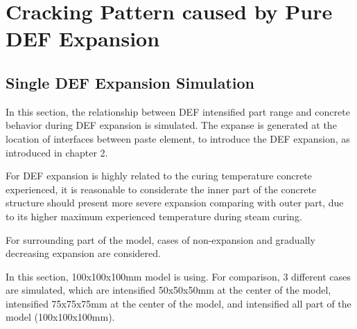 \clearpage
\section{Cracking Pattern caused by Pure DEF Expansion}

\subsection{Single DEF Expansion Simulation}

In this section, the relationship between DEF intensified part range and concrete behavior during DEF expansion is simulated. The expanse is generated at the location of interfaces between paste element, to introduce the DEF expansion, as introduced in chapter 2.

For DEF expansion is highly related to the curing temperature concrete experienced, it is reasonable to considerate the inner part of the concrete structure should present more severe expansion comparing with outer part, due to its higher maximum experienced temperature during steam curing.

For surrounding part of the model, cases of non-expansion and gradually decreasing expansion are considered.

In this section, 100x100x100mm model is using. For comparison, 3 different cases are simulated, which are intensified 50x50x50mm at the center of the model, intensified 75x75x75mm at the center of the model, and intensified all part of the model (100x100x100mm).

